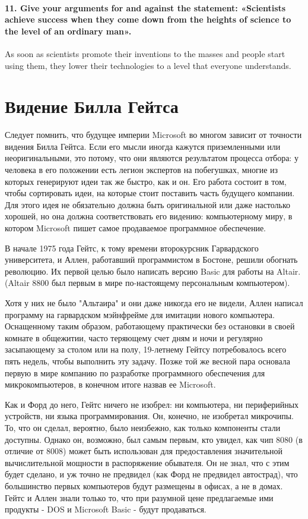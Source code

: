     \paragraph{11. Give your arguments for and against the statement: «Scientists achieve success when they come down from the heights of science to the level of an ordinary man».}
    As soon as scientists promote their inventions to the masses and people start using them, they lower their technologies to a level that everyone understands.






\section*{Видение Билла Гейтса}
Следует помнить, что будущее империи Microsoft во многом зависит от точности видения Билла Гейтса. Если его мысли иногда кажутся приземленными или неоригинальными, это потому, что они являются результатом процесса отбора: у человека в его положении есть легион экспертов на побегушках, многие из которых генерируют идеи так же быстро, как и он. Его работа состоит в том, чтобы сортировать идеи, на которые стоит поставить часть будущего компании. Для этого идея не обязательно должна быть оригинальной или даже настолько хорошей, но она должна соответствовать его видению: компьютерному миру, в котором Microsoft пишет самое продаваемое программное обеспечение.


В начале 1975 года Гейтс, к тому времени второкурсник Гарвардского университета, и Аллен, работавший программистом в Бостоне, решили обогнать революцию. Их первой целью было написать версию Basic для работы на Altair. (Altair 8800 был первым в мире по-настоящему персональным компьютером).


Хотя у них не было "Альтаира" \- и они даже никогда его не видели, \- Аллен написал программу на гарвардском мэйнфрейме для имитации нового компьютера. Оснащенному таким образом, работающему практически без остановки в своей комнате в общежитии, часто теряющему счет дням и ночи и регулярно засыпающему за столом или на полу, 19-летнему Гейтсу потребовалось всего пять недель, чтобы выполнить эту задачу. Позже той же весной пара основала первую в мире компанию по разработке программного обеспечения для микрокомпьютеров, в конечном итоге назвав ее Microsoft.


Как и Форд до него, Гейтс ничего не изобрел: ни компьютера, ни периферийных устройств, ни языка программирования. Он, конечно, не изобретал микрочипы. То, что он сделал, вероятно, было неизбежно, как только компоненты стали доступны. Однако он, возможно, был самым первым, кто увидел, как чип 8080 (в отличие от 8008) может быть использован для предоставления значительной вычислительной мощности в распоряжение обывателя. Он не знал, что с этим будет сделано, и уж точно не предвидел (как Форд не предвидел автострад), что большинство первых компьютеров будут размещены в офисах, а не в домах. Гейтс и Аллен знали только то, что при разумной цене предлагаемые ими продукты - DOS и Microsoft Basic - будут продаваться.


